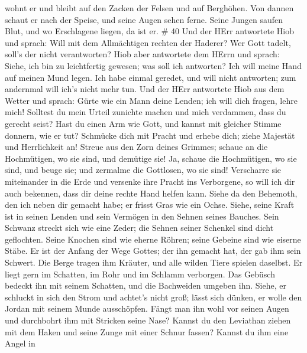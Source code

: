 wohnt er und bleibt auf den Zacken der Felsen und auf Berghöhen.
 Von dannen schaut er nach der Speise, und seine Augen
sehen ferne.  Seine Jungen saufen Blut, und wo Erschlagene
liegen, da ist er. \# 40  Und der HErr antwortete Hiob und
sprach:  Will mit dem Allmächtigen rechten der Haderer? Wer
Gott tadelt, soll's der nicht verantworten?  Hiob aber
antwortete dem HErrn und sprach:  Siehe, ich bin zu
leichtfertig gewesen; was soll ich antworten? Ich will meine Hand auf
meinen Mund legen.  Ich habe einmal geredet, und will nicht
antworten; zum andernmal will ich's nicht mehr tun.  Und der
HErr antwortete Hiob aus dem Wetter und sprach:  Gürte wie
ein Mann deine Lenden; ich will dich fragen, lehre mich! 
Solltest du mein Urteil zunichte machen und mich verdammen, dass du
gerecht seist?  Hast du einen Arm wie Gott, und kannst mit
gleicher Stimme donnern, wie er tut?  Schmücke dich mit
Pracht und erhebe dich; ziehe Majestät und Herrlichkeit an!
 Streue aus den Zorn deines Grimmes; schaue an die
Hochmütigen, wo sie sind, und demütige sie!  Ja, schaue die
Hochmütigen, wo sie sind, und beuge sie; und zermalme die Gottlosen, wo
sie sind!  Verscharre sie miteinander in die Erde und
versenke ihre Pracht ins Verborgene,  so will ich dir auch
bekennen, dass dir deine rechte Hand helfen kann.  Siehe da
den Behemoth, den ich neben dir gemacht habe; er frisst Gras wie ein
Ochse.  Siehe, seine Kraft ist in seinen Lenden und sein
Vermögen in den Sehnen seines Bauches.  Sein Schwanz
streckt sich wie eine Zeder; die Sehnen seiner Schenkel sind dicht
geflochten.  Seine Knochen sind wie eherne Röhren; seine
Gebeine sind wie eiserne Stäbe.  Er ist der Anfang der Wege
Gottes; der ihn gemacht hat, der gab ihm sein Schwert.  Die
Berge tragen ihm Kräuter, und alle wilden Tiere spielen daselbst.
 Er liegt gern im Schatten, im Rohr und im Schlamm
verborgen.  Das Gebüsch bedeckt ihn mit seinem Schatten,
und die Bachweiden umgeben ihn.  Siehe, er schluckt in sich
den Strom und achtet's nicht groß; lässt sich dünken, er wolle den
Jordan mit seinem Munde ausschöpfen.  Fängt man ihn wohl
vor seinen Augen und durchbohrt ihm mit Stricken seine Nase?
 Kannst du den Leviathan ziehen mit dem Haken und seine
Zunge mit einer Schnur fassen?  Kannst du ihm eine Angel in
